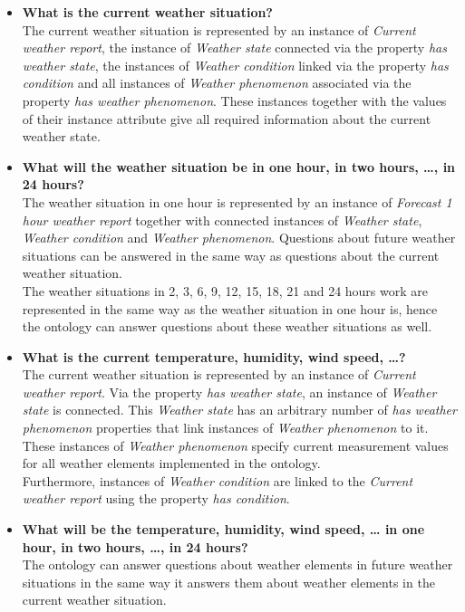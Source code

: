 \begin{itemize}
  \item \textbf{What is the current weather situation?}\\
    The current weather situation is represented by an instance of \emph{Current weather report}, the instance of \emph{Weather state} connected via the property \emph{has weather state}, the instances of \emph{Weather condition} linked via the property \emph{has condition} and all instances of \emph{Weather phenomenon} associated via the property \emph{has weather phenomenon}. These instances together with the values of their instance attribute give all required information about the current weather state.
  \item \textbf{What will the weather situation be in one hour, in two hours, …, in 24 hours?}\\
    The weather situation in one hour is represented by an instance of \emph{Forecast 1 hour weather report} together with connected instances of \emph{Weather state}, \emph{Weather condition} and \emph{Weather phenomenon}. Questions about future weather situations can be answered in the same way as questions about the current weather situation.\\
    The weather situations in 2, 3, 6, 9, 12, 15, 18, 21 and 24 hours work are represented in the same way as the weather situation in one hour is, hence the ontology can answer questions about these weather situations as well.
  \item \textbf{What is the current temperature, humidity, wind speed, …?}\\
    The current weather situation is represented by an instance of \emph{Current weather report}. Via the property \emph{has weather state}, an instance of \emph{Weather state} is connected. This \emph{Weather state} has an arbitrary number of \emph{has weather phenomenon} properties that link instances of \emph{Weather phenomenon} to it. These instances of \emph{Weather phenomenon} specify current measurement values for all weather elements implemented in the ontology.\\
    Furthermore, instances of \emph{Weather condition} are linked to the \emph{Current weather report} using the property \emph{has condition}.
  \item \textbf{What will be the temperature, humidity, wind speed, … in one hour, in two hours, …, in 24 hours?}\\
    The ontology can answer questions about weather elements in future weather situations in the same way it answers them about weather elements in the current weather situation.

\end{itemize}
